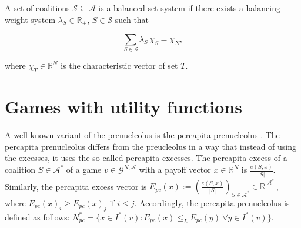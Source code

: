 \documentclass[a4paper,12pt]{article}
\newtheorem{definition}[theorem]{Definition}
\theoremstyle{definition}
\theoremstyle{remark}
\begin{document}


A set of coalitions $\mathcal{S} \subseteq \mathcal{A}$ is a balanced set system if there exists a balancing weight system $\lambda_S \in \mathbb{R}_+$, $S \in \mathcal{S}$ such that

\begin{equation*}
\sum \limits_{S \in \mathcal{S}} \lambda_S \, \chi_S = \chi_N,
\end{equation*}

\noindent where $\chi_T \in \mathbb{R}^N$ is the characteristic vector of set $T$.



\section{Games with utility functions}\label{sec:u}

A well-known variant of the prenucleolus is the percapita prenucleolus \citep{Grotte1970, Grotte1972}. The percapita prenucleolus differs from the preucleolus in a way that instead of using the excesses, it uses the so-called percapita excesses. The percapita excess of a coalition $S \in \mathcal{A}^\ast$ of a game $v \in \mathcal{G}^{N,\mathcal{A}}$ with a payoff vector $x \in \mathbb{R}^N$ is $\frac{e(S, x)}{|S|}$. Similarly, the percapita excess vector is $E_{pc} (x) := (\frac{e (S,x)}{|S|})_{S \in \mathcal{A}^\ast} \in \mathbb{R}^{|\mathcal{A}^\ast|}$, where $E_{pc} (x)_i \geq E_{pc} (x)_j$ if $i \leq j$. Accordingly, the percapita prenucleolus is defined as follows: $N^\ast_{pc} = \{ x\in I^*(v) \colon E_{pc} (x) \leq _L E_{pc} (y) \ \forall y\in I^*(v)\}$.
\end{document}
